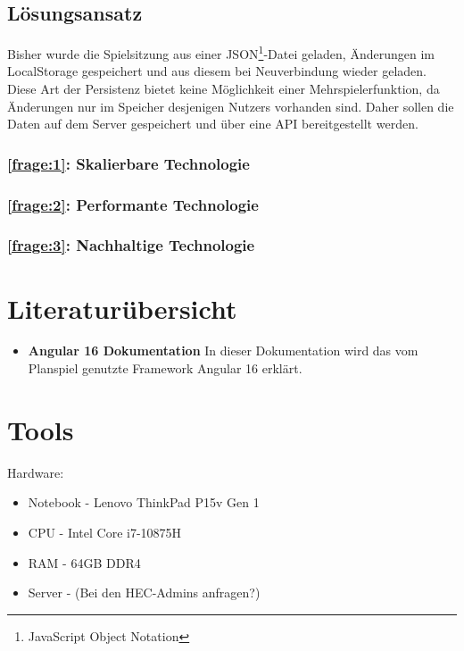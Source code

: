 \documentclass[11pt]{scrartcl}
\begin{document}
	\subsection{Lösungsansatz}

    Bisher wurde die Spielsitzung aus einer JSON\footnote{JavaScript Object Notation}-Datei geladen, Änderungen im LocalStorage gespeichert und aus diesem bei Neuverbindung wieder geladen. Diese Art der Persistenz bietet keine Möglichkeit einer Mehrspielerfunktion, da Änderungen nur im Speicher desjenigen Nutzers vorhanden sind. Daher sollen die Daten auf dem Server gespeichert und über eine API bereitgestellt werden.

    \subsubsection{\ref{frage:1}: Skalierbare Technologie}

    \subsubsection{\ref{frage:2}: Performante Technologie}

    \subsubsection{\ref{frage:3}: Nachhaltige Technologie}

	\pagebreak
	
	\section{Literaturübersicht}
	
    \begin{itemize}
        \item \textbf{Angular 16 Dokumentation}\cite{Angular16} In dieser Dokumentation wird das vom Planspiel genutzte Framework Angular 16 erklärt.
    \end{itemize} 
	
	\pagebreak
	
	\section{Tools} %

	\medskip
	\noindent
	Hardware:
	\begin{itemize}
		\item Notebook \@- Lenovo ThinkPad P15v Gen 1
        \item CPU \@- Intel Core i7\@-10875H
        \item RAM \@- 64GB DDR4
        \item Server \@- (Bei den HEC-Admins anfragen?)
	\end{itemize}
\end{document}
